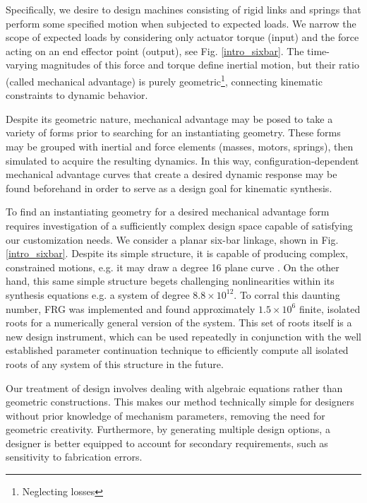 \documentclass[journal]{IEEEtran}
\begin{document}
Specifically, we desire to design machines consisting of rigid links and springs that perform some specified motion when subjected to expected loads.
We narrow the scope of expected loads by considering only actuator torque (input) and the force acting on an end effector point (output), see Fig. \ref{intro_sixbar}.
The time-varying magnitudes of this force and torque define inertial motion, but their ratio (called mechanical advantage) is purely geometric\footnote{Neglecting losses}, connecting kinematic constraints to dynamic behavior.

Despite its geometric nature, mechanical advantage may be posed to take a variety of forms prior to searching for an instantiating geometry.
These forms may be grouped with inertial and force elements (masses, motors, springs), then simulated to acquire the resulting dynamics.
In this way, configuration-dependent mechanical advantage curves that create a desired dynamic response may be found beforehand in order to serve as a design goal for kinematic synthesis.




To find an instantiating geometry for a desired mechanical advantage form requires investigation of a sufficiently complex design space capable of satisfying our customization needs.
We consider a planar six-bar linkage, shown in Fig. \ref{intro_sixbar}.
Despite its simple structure, it is capable of producing complex, constrained motions, e.g. it may draw a degree 16 plane curve \cite{primroseSixbarMotionII1967}.
On the other hand, this same simple structure begets challenging nonlinearities within its synthesis equations e.g. a system of degree $8.8 \times 10^{12}$.
To corral this daunting number, FRG was implemented and found approximately $1.5 \times 10^6$ finite, isolated roots for a numerically general version of the system.
This set of roots itself is a new design instrument, which can be used repeatedly in conjunction with the well established parameter continuation technique \cite{morganCoefficientparameterPolynomialContinuation1989} to efficiently compute all isolated roots of any system of this structure in the future.


Our treatment of design involves dealing with algebraic equations rather than geometric constructions.
This makes our method technically simple for designers without prior knowledge of mechanism parameters, removing the need for geometric creativity.
Furthermore, by generating multiple design options, a designer is better equipped to account for secondary requirements, such as sensitivity to fabrication errors.
\end{document}
